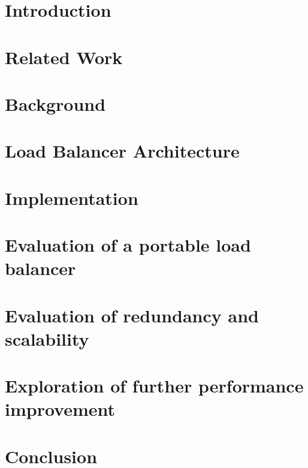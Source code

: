 
\graphicspath{{Manuscript/}}

\chapter{Introduction}\label{chapter:introduction}


\chapter{Related Work}\label{chapter:related}


\chapter{Background}\label{chapter:background}


\chapter{Load Balancer Architecture}\label{chapter:architecture}


\chapter{Implementation}\label{chapter:implemetation}


\chapter{Evaluation of a portable load balancer}\label{chapter:portablelb}


\chapter{Evaluation of redundancy and scalability}\label{chapter:redundancy}


\chapter{Exploration of further performance improvement}\label{chapter:performance}


\chapter{Conclusion}\label{chapter:conclusion}




